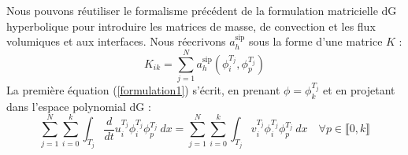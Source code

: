 
Nous pouvons réutiliser le formalisme précédent de la formulation matricielle dG hyperbolique pour introduire les matrices de masse, de convection et les flux volumiques et aux interfaces.
Nous réecrivons $a_h^{\text{sip}}$ sous la forme d'une matrice $K$ :
$$K_{ik} = \sum_{j=1}^{N} a_h^{\text{sip}}(\phi_i^{T_j},\phi_p^{T_j}) $$
La première équation (\ref{formulation1}) s'écrit, en prenant $\phi = \phi_k^{T_j}$ et en projetant dans l'espace polynomial dG :
$$\sum_{j=1}^{N} \sum_{i=0}^{k} \int_{T_j} \frac{d}{dt} u_i^{T_j} \phi_i^{T_j} \phi_p^{T_j} \ dx = \sum_{j=1}^{N} \sum_{i=0}^{k} \int_{T_j} v_i^{T_j} \phi_i^{T_j} \phi_p^{T_j} \ dx \quad \forall p \in \llbracket 0,k \rrbracket $$

